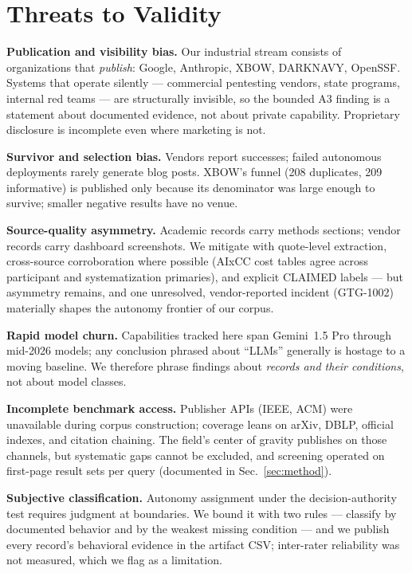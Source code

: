 \documentclass[conference,compsoc]{IEEEtran}
\begin{document}
\section{Threats to Validity}
\label{sec:threats}

\textbf{Publication and visibility bias.} Our industrial stream consists of organizations that
\emph{publish}: Google, Anthropic, XBOW, DARKNAVY, OpenSSF. Systems that operate silently ---
commercial pentesting vendors, state programs, internal red teams --- are structurally
invisible, so the bounded A3 finding is a statement about documented evidence, not about private
capability. Proprietary disclosure is incomplete even where marketing is not.

\textbf{Survivor and selection bias.} Vendors report successes; failed autonomous deployments
rarely generate blog posts. XBOW's funnel (208 duplicates, 209 informative) is published only
because its denominator was large enough to survive; smaller negative results have no venue.

\textbf{Source-quality asymmetry.} Academic records carry methods sections; vendor records
carry dashboard screenshots. We mitigate with quote-level extraction, cross-source
corroboration where possible (AIxCC cost tables agree across participant and systematization
primaries), and explicit CLAIMED labels --- but asymmetry remains, and one unresolved,
vendor-reported incident (GTG-1002) materially shapes the autonomy frontier of our corpus.

\textbf{Rapid model churn.} Capabilities tracked here span Gemini~1.5 Pro through mid-2026
models; any conclusion phrased about ``LLMs'' generally is hostage to a moving baseline. We
therefore phrase findings about \emph{records and their conditions}, not about model classes.

\textbf{Incomplete benchmark access.} Publisher APIs (IEEE, ACM) were unavailable during corpus
construction; coverage leans on arXiv, DBLP, official indexes, and citation chaining. The
field's center of gravity publishes on those channels, but systematic gaps cannot be excluded,
and screening operated on first-page result sets per query (documented in
Sec.~\ref{sec:method}).

\textbf{Subjective classification.} Autonomy assignment under the decision-authority test
requires judgment at boundaries. We bound it with two rules --- classify by documented behavior
and by the weakest missing condition --- and we publish every record's behavioral evidence in
the artifact CSV; inter-rater reliability was not measured, which we flag as a limitation.
\end{document}
